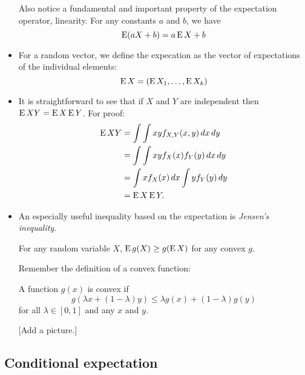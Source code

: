 \begin{itemize}
  Also notice a fundamental and important property of the expectation
  operator, linearity.  For any constants $a$ and $b$, we have
  \begin{equation*}
    \operatorname{E}(a X + b) = a \operatorname{E} X + b
  \end{equation*}

\item For a random vector, we define the expecation as the vector of
  expectations of the individual elements:
  \begin{equation*}
    \operatorname{E} X = (\operatorname{E} X_1,\dots,\operatorname{E} X_k)
  \end{equation*}

\item It is straightforward to see that if $X$ and $Y$ are
  independent then $\operatorname{E} XY = \operatorname{E} X \operatorname{E} Y$.  For proof:
  \begin{align*}
    \operatorname{E} XY
    &= \int\int x y f_{X,Y}(x,y) \,dx \,dy \\
    &= \int\int xy f_X(x) f_Y(y) \,dx \,dy \\
    &= \int x f_X(x) \,dx \int y f_Y(y) \,dy \\
    &= \operatorname{E} X \operatorname{E} Y.
  \end{align*}

\item An especially useful inequality based on the expectation is
  \emph{Jensen's inequality}.
  \begin{thm}
    For any random variable $X$, $\operatorname{E} g(X) \geq g(\operatorname{E} X)$ for any convex
    $g$.
  \end{thm}

  Remember the definition of a convex function:
  \begin{defn}
    A function $g(x)$ is convex if 
    \begin{equation*}
      g( \lambda x + (1-\lambda) y ) \leq \lambda g(x) + (1-\lambda) g(y) 
    \end{equation*}
    for all $\lambda \in [0,1]$ and any $x$ and $y$.
  \end{defn}

  [Add a picture.]

\end{itemize}

\subsection{Conditional expectation}

